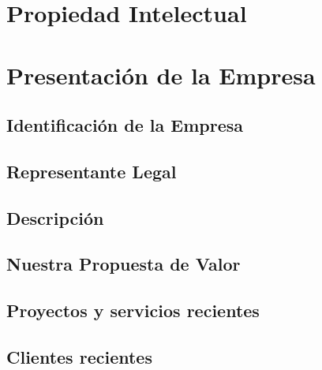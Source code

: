 \documentclass{report}
\begin{document}
	\chapter{Propiedad Intelectual}
	\chapter{Presentación de la Empresa}
		\section{Identificación de la Empresa}
		\section{Representante Legal}
		\section{Descripción}
		\section{Nuestra Propuesta de Valor}
		\section{Proyectos y servicios recientes}
		\section{Clientes recientes}
	
\end{document}
